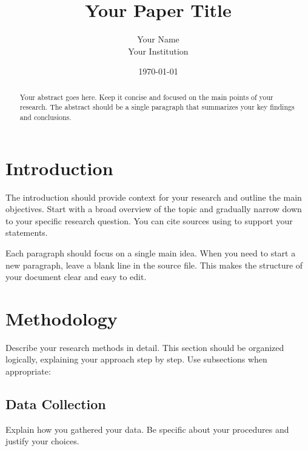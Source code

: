 \documentclass[12pt, titlepage]{article}
\title{\vspace{-1.5in}Your Paper Title}
\author{Your Name\\Your Institution}
\date{\today}
\begin{document}
\maketitle

\begin{abstract}
  Your abstract goes here. Keep it concise and focused on the main points of your 
  research. The abstract should be a single paragraph that summarizes your key 
  findings and conclusions.
\end{abstract}

\section{Introduction}
  The introduction should provide context for your research and outline the main 
  objectives. Start with a broad overview of the topic and gradually narrow down 
  to your specific research question. You can cite sources using 
  \cite{example2024} to support your statements.

  Each paragraph should focus on a single main idea. When you need to start a new 
  paragraph, leave a blank line in the source file. This makes the structure of 
  your document clear and easy to edit.

\section{Methodology}
  Describe your research methods in detail. This section should be organized 
  logically, explaining your approach step by step. Use subsections when 
  appropriate:

  \subsection{Data Collection}
    Explain how you gathered your data. Be specific about your procedures and 
    justify your choices.
\end{document}

